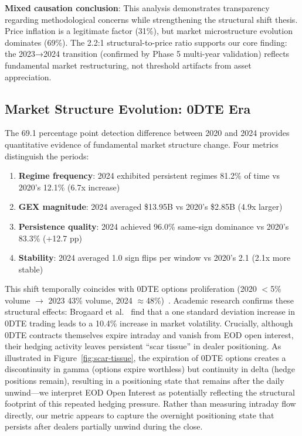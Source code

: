 \vspace{0.2cm}

\noindent\textbf{Mixed causation conclusion}: This analysis demonstrates transparency regarding methodological concerns while strengthening the structural shift thesis. Price inflation is a legitimate factor (31\%), but market microstructure evolution dominates (69\%). The 2.2:1 structural-to-price ratio supports our core finding: the 2023→2024 transition (confirmed by Phase 5 multi-year validation) reflects fundamental market restructuring, not threshold artifacts from asset appreciation.

\subsection{Market Structure Evolution: 0DTE Era}

\vspace{0.2cm}

The 69.1 percentage point detection difference between 2020 and 2024 provides quantitative evidence of fundamental market structure change. Four metrics distinguish the periods:

\vspace{0.1cm}

\begin{enumerate}
\item \textbf{Regime frequency}: 2024 exhibited persistent regimes 81.2\% of time vs 2020's 12.1\% (6.7x increase)
\item \textbf{GEX magnitude}: 2024 averaged \$13.95B vs 2020's \$2.85B (4.9x larger)
\item \textbf{Persistence quality}: 2024 achieved 96.0\% same-sign dominance vs 2020's 83.3\% (+12.7 pp)
\item \textbf{Stability}: 2024 averaged 1.0 sign flips per window vs 2020's 2.1 (2.1x more stable)
\end{enumerate}

\vspace{0.2cm}

This shift temporally coincides with 0DTE options proliferation (2020 $<$5\% volume $\rightarrow$ 2023 43\% volume, 2024 $\approx$48\%)~\citep{cboe2024zero}. Academic research confirms these structural effects: Brogaard et al.~\citep{brogaard2023does} find that a one standard deviation increase in 0DTE trading leads to a 10.4\% increase in market volatility. Crucially, although 0DTE contracts themselves expire intraday and vanish from EOD open interest, their hedging activity leaves persistent ``scar tissue'' in dealer positioning. As illustrated in Figure~\ref{fig:scar-tissue}, the expiration of 0DTE options creates a discontinuity in gamma (options expire worthless) but continuity in delta (hedge positions remain), resulting in a positioning state that remains after the daily unwind---we interpret EOD Open Interest as potentially reflecting the structural footprint of this repeated hedging pressure. Rather than measuring intraday flow directly, our metric appears to capture the overnight positioning state that persists after dealers partially unwind during the close.

